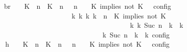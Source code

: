 \begin{isabellebody}
\ \ \ \ \ \ \isamarkupfalse%
\ \isamarkupfalse%
\ br{}{\isacharcolon}\ {\isacartoucheopen}{\isasymrho}\ {\isasymin}\ {\isasymlbrakk}\ {\isacharparenleft}{\isacharparenleft}K\ {\isasymUp}\ n{\isacharparenright}\ {\isacharhash}\ {\isacharparenleft}K\ {\isasymnot}{\isasymUp}\ n{\isacharparenright}\ {\isacharhash}\ {\isasymGamma}{\isacharparenright}{\isacharcomma}\ n\ {\isasymturnstile}\ {\isasymPsi}\ {\isasymtriangleright}\ {\isacharparenleft}{\isacharparenleft}K\ implies\ not\ K\ {\isacharhash}\ {\isasymPhi}{\isacharparenright}\ {\isasymrbrakk}\isactrlsub c\isactrlsub o\isactrlsub n\isactrlsub f\isactrlsub i\isactrlsub g\isanewline
\ \ \ \ \ \ \ \ \ \ \ \ \ \ \ \ \ \ \ \ \ \ \ \ \ \ \ \ {\isasymLongrightarrow}\ {\isasymexists}{\isasymGamma}\isactrlsub k\ {\isasymPsi}\isactrlsub k\ {\isasymPhi}\isactrlsub k\ k{\isachardot}\ {\isacharparenleft}{\isacharparenleft}{\isasymGamma}{\isacharcomma}\ n\ {\isasymturnstile}\ {\isacharparenleft}{\isacharparenleft}K\ implies\ not\ K\ {\isacharhash}\ {\isasymPsi}{\isacharparenright}\ {\isasymtriangleright}\ {\isasymPhi}{\isacharparenright}\isanewline
\ \ \ \ \ \ \ \ \ \ \ \ \ \ \ \ \ \ \ \ \ \ \ \ \ \ \ \ \ \ \ \ \ \ \ \ \ \ \ \ \ \ \ \ \ \ {\isasymhookrightarrow}\isactrlbsup k\isactrlesup \ {\isacharparenleft}{\isasymGamma}\isactrlsub k{\isacharcomma}\ Suc\ n\ {\isasymturnstile}\ {\isasymPsi}\isactrlsub k\ {\isasymtriangleright}\ {\isasymPhi}\isactrlsub k{\isacharparenright}{\isacharparenright}\isanewline
\ \ \ \ \ \ \ \ \ \ \ \ \ \ \ \ \ \ \ \ \ \ \ \ \ \ \ \ \ \ \ \ \ \ {\isasymand}\ {\isasymrho}\ {\isasymin}\ {\isasymlbrakk}\ {\isasymGamma}\isactrlsub k{\isacharcomma}\ Suc\ n\ {\isasymturnstile}\ {\isasymPsi}\isactrlsub k\ {\isasymtriangleright}\ {\isasymPhi}\isactrlsub k\ {\isasymrbrakk}\isactrlsub c\isactrlsub o\isactrlsub n\isactrlsub f\isactrlsub i\isactrlsub g{\isacartoucheclose}\isanewline
\ \ \ \ \ \ \isamarkupfalse%
\ {\isacharminus}\isanewline
\ \ \ \ \ \ \ \ \isamarkupfalse%
\ h{}{\isacharcolon}\ {\isacartoucheopen}{\isasymrho}\ {\isasymin}\ {\isasymlbrakk}\ {\isacharparenleft}{\isacharparenleft}K\ {\isasymUp}\ n{\isacharparenright}\ {\isacharhash}\ {\isacharparenleft}K\ {\isasymnot}{\isasymUp}\ n{\isacharparenright}\ {\isacharhash}\ {\isasymGamma}{\isacharparenright}{\isacharcomma}\ n\ {\isasymturnstile}\ {\isasymPsi}\ {\isasymtriangleright}\ {\isacharparenleft}{\isacharparenleft}K\ implies\ not\ K\ {\isacharhash}\ {\isasymPhi}{\isacharparenright}\ {\isasymrbrakk}\isactrlsub c\isactrlsub o\isactrlsub n\isactrlsub f\isactrlsub i\isactrlsub g{\isacartoucheclose}\isanewline

\end{isabellebody}
